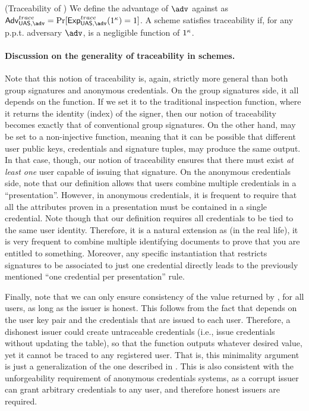 \begin{definition}{(Traceability of \UAS)}
  We define the advantage \AdvTrace of $\adv$ against \ExpTrace as
  $\AdvTrace=\Pr\lbrack\ExpTrace(1^\secpar)=1\rbrack$.
  A \UAS scheme satisfies traceability if, for any p.p.t. adversary $\adv$,
  \AdvTrace is a negligible function of $1^\kappa$.
\end{definition}

\paragraph{Discussion on the generality of traceability in \UAS schemes.} %
Note that this notion of traceability is, again, strictly more general than
both group signatures and anonymous credentials. On the group signatures side,
it all depends on the \Inspect function. If we set it to the traditional
inspection function, where it returns the identity (index) of the signer, then
our notion of traceability becomes exactly that of conventional group
signatures. On the other hand, \Inspect may be set to a non-injective function,
meaning that it can be possible that different user public keys, credentials and
signature tuples, may produce the same output. In that case, though, our notion
of traceability ensures that there must exist \emph{at least one} user capable
of issuing that signature.
%
On the anonymous credentials side, note that our definition allows that users
combine multiple credentials in a ``presentation''. However, in anonymous
credentials, it is frequent to require that all the attributes proven in a
presentation must be contained in a single credential. Note though that our
definition requires all credentials to be tied to the same user identity.
Therefore, it is a natural extension as (in the real life), it is very frequent
to combine multiple identifying documents to prove that you are entitled to
something. Moreover, any specific instantiation that restricts signatures
to be associated to just one credential directly leads to the previously
mentioned ``one credential per presentation'' rule.

Finally, note that we can only ensure consistency of the value returned by
\finsp, for all users, as long as the issuer is honest. This follows from the
fact that \finsp depends on the user key pair and the credentials that are
issued to each user. Therefore, a dishonest issuer could create untraceable
credentials (i.e., issue credentials without updating the \trans table), so that
the \finsp function outputs whatever desired value, yet it cannot be traced to
any registered user. That is, this minimality argument is just a generalization
of the one described in \cite[Section 4.3]{bsz05}. This is also consistent with
the unforgeability requirement of anonymous credentials systems, as a corrupt
issuer can grant arbitrary credentials to any user, and therefore honest
issuers are required.

